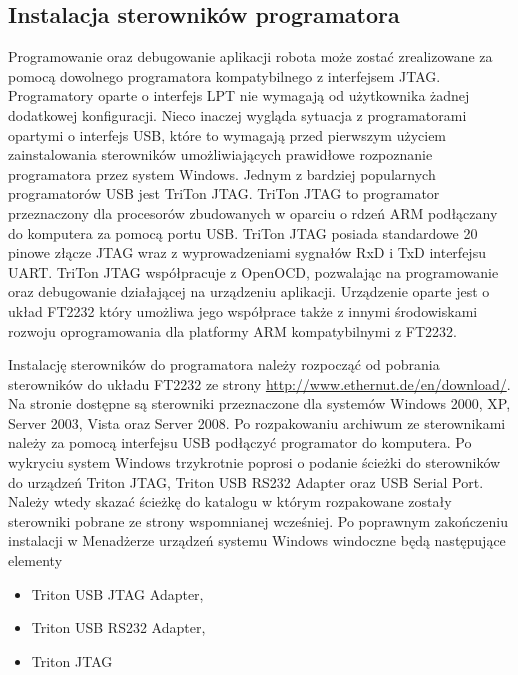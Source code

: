 \subsection{Instalacja sterowników programatora}
Programowanie oraz debugowanie aplikacji robota może zostać zrealizowane za
pomocą dowolnego programatora kompatybilnego z interfejsem JTAG. Programatory
oparte o interfejs LPT nie wymagają od użytkownika żadnej dodatkowej
konfiguracji. Nieco inaczej wygląda sytuacja z programatorami opartymi o
interfejs USB, które to wymagają przed pierwszym użyciem zainstalowania
sterowników umożliwiających prawidłowe rozpoznanie programatora przez system
Windows. Jednym z bardziej popularnych programatorów USB jest TriTon JTAG.
TriTon JTAG to programator przeznaczony dla procesorów zbudowanych w oparciu o
rdzeń ARM podłączany do komputera za pomocą portu USB. TriTon JTAG posiada standardowe 20 pinowe złącze JTAG wraz z
wyprowadzeniami sygnałów RxD i TxD interfejsu UART. TriTon JTAG współpracuje z
OpenOCD, pozwalając na programowanie oraz debugowanie działającej na
urządzeniu aplikacji. Urządzenie oparte jest o układ FT2232 który umożliwa jego
współprace także z innymi środowiskami rozwoju oprogramowania dla platformy ARM
kompatybilnymi z FT2232. 

Instalację sterowników do programatora należy rozpocząć od pobrania sterowników do układu FT2232 ze strony \url{http://www.ethernut.de/en/download/}. Na stronie dostępne są sterowniki
przeznaczone dla systemów Windows 2000, XP, Server 2003, Vista oraz Server 2008.
Po rozpakowaniu archiwum ze sterownikami należy za pomocą interfejsu USB
podłączyć programator do komputera. Po wykryciu system Windows trzykrotnie
poprosi o podanie ścieżki do sterowników do urządzeń Triton JTAG, Triton USB
RS232 Adapter oraz USB Serial Port. Należy wtedy skazać ścieżkę do katalogu w
którym rozpakowane zostały sterowniki pobrane ze strony wspomnianej wcześniej.
Po poprawnym zakończeniu instalacji w Menadżerze urządzeń systemu Windows
windoczne będą następujące elementy
\begin{itemize}
  \item Triton USB JTAG Adapter,
  \item Triton USB RS232 Adapter,
  \item Triton JTAG
\end{itemize}
